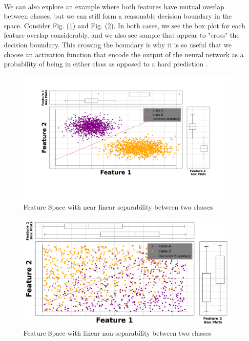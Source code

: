 \documentclass[12pt,letterpaper]{article}
\begin{document}
\paragraph*{}We can also explore an example where both features have mutual overlap between classes, but we can still form a reasonable decision boundary in the space. Consider Fig. (\ref{fig-LinSep2}) and Fig. (\ref{fig-LinNonSep}). In both cases, we see the box plot for each feature overlap considerably, and we also see sample that appear to "cross" the decision boundary. This crossing the boundary is why it is so useful that we choose an activation function that encode the output of the neural network as a probability of being in either class as opposed to a hard prediction \cite{Loy,Geron}.

\begin{figure}[H]
\begin{center}
\includegraphics[scale=0.35]{../MakeFigures/LinearSeparable2}
\end{center}
\caption{Feature Space with near linear separability between two classes}
\label{fig-LinSep2}
\end{figure}

\begin{figure}[H]
\begin{center}
\includegraphics[scale=0.35]{../MakeFigures/LinearNonSeparable}
\end{center}
\caption{Feature Space with linear non-separability between two classes}
\label{fig-LinNonSep}
\end{figure}
\end{document}
